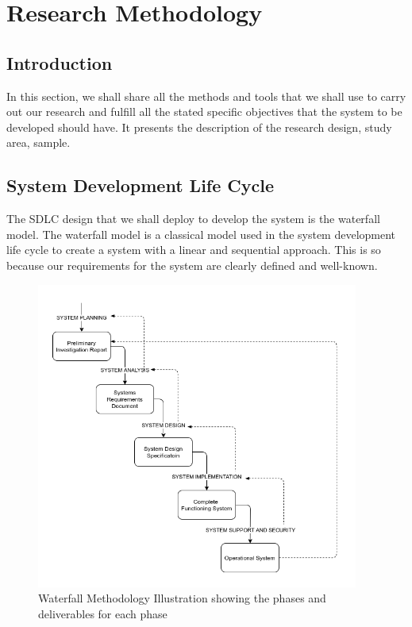 \documentclass{article}
\begin{document}
\newpage
\section{Research Methodology}
\subsection{Introduction }
In this section, we shall share all the methods and tools that we shall use to carry out our research and fulfill all the stated specific objectives that the system to be developed should have.  It presents the description of the research design, study area, sample. 

\subsection{System Development Life Cycle}
The SDLC design that we shall deploy to develop the system is the waterfall model. The waterfall model is a classical model used in the system development life cycle to create a system with a linear and sequential approach. This is so because our requirements for the system are clearly defined and well-known.


\vspace{10px}
\begin{figure}[H]
    \centering
    \includegraphics[width=400px]{Images/waterfall-v3.png}
    \caption{Waterfall Methodology Illustration showing the phases and deliverables for each phase}
    \label{waterfall-SDLC-method-image}
\end{figure}
\vspace{10px}
\end{document}

